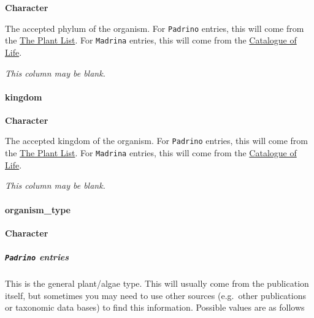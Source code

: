 \documentclass[]{article}
\let\oldparagraph\paragraph
\renewcommand{\paragraph}[1]{\oldparagraph{#1}\mbox{}}
\let\oldsubparagraph\subparagraph
\renewcommand{\subparagraph}[1]{\oldsubparagraph{#1}\mbox{}}
\begin{document}
\textbf{Character}

The accepted phylum of the organism. For \texttt{Padrino} entries, this
will come from the \href{http://www.theplantlist.org/}{The Plant List}.
For \texttt{Madrina} entries, this will come from the
\href{http://www.catalogueoflife.org/}{Catalogue of Life}.

\emph{This column may be blank.}

\paragraph{kingdom}\label{kingdom}

\textbf{Character}

The accepted kingdom of the organism. For \texttt{Padrino} entries, this
will come from the \href{http://www.theplantlist.org/}{The Plant List}.
For \texttt{Madrina} entries, this will come from the
\href{http://www.catalogueoflife.org/}{Catalogue of Life}.

\emph{This column may be blank.}

\paragraph{organism\_type}\label{organism_type}

\textbf{Character}

\subparagraph{\texorpdfstring{\texttt{Padrino}
entries}{Padrino entries}}\label{padrino-entries}

This is the general plant/algae type. This will usually come from the
publication itself, but sometimes you may need to use other sources
(e.g.~other publications or taxonomic data bases) to find this
information. Possible values are as follows
\end{document}
